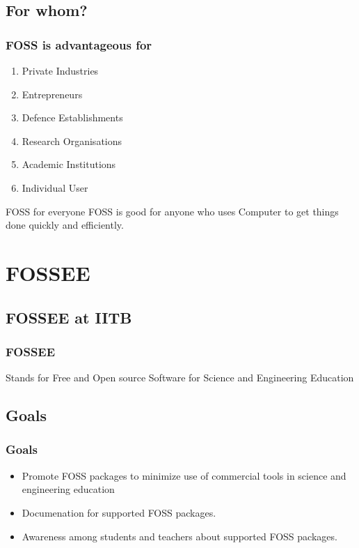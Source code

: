 \documentclass[compress,red]{beamer} %
\begin{document}
\subsection{For whom?}
\begin{frame}
\frametitle{FOSS is advantageous for}
\begin{enumerate}
\item Private Industries \pause
\item Entrepreneurs \pause
\item Defence Establishments \pause
\item Research Organisations \pause
\item Academic Institutions\pause
\item Individual User \pause
\end{enumerate}
\begin{block}{FOSS for everyone}
FOSS is good for anyone who uses Computer to get things done quickly and efficiently. 
\end{block}
\end{frame}


\section{FOSSEE}

\subsection{FOSSEE at IITB}
\begin{frame}
\frametitle{FOSSEE}
\begin{block}{Stands for}
Free and Open source Software for Science and Engineering
Education
\end{block}
\vspace{1cm}
\begin{overlayarea}{\textwidth}{5cm}
\end{overlayarea}
\end{frame}

\subsection{Goals}
\begin{frame}
\frametitle{Goals}
\begin{itemize}
\item Promote \alert{FOSS} packages to minimize use of commercial tools in science and engineering education
\item Documenation for supported \alert{FOSS} packages.
\item Awareness among students and teachers about supported \alert{FOSS} packages. 
\end{itemize}
\end{frame}
\end{document}
